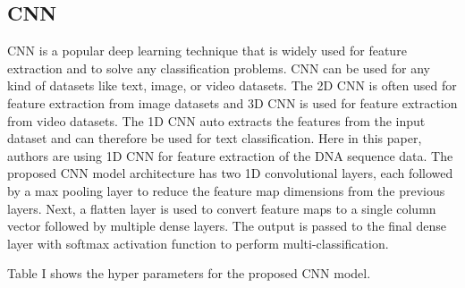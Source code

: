 \documentclass[journal]{IEEEtran}
\begin{document}
  \subsection{CNN}
    CNN is a popular deep learning technique that is widely used for feature extraction 
    and to solve any classification problems. 
    CNN can be used for any kind of datasets like text, image, or video datasets. 
    The 2D CNN is often used for feature extraction from image datasets and 
    3D CNN is used for feature extraction from video datasets. 
    The 1D CNN auto extracts the features from the input dataset and can therefore be used 
    for text classification. Here in this paper, authors are using 1D CNN for feature extraction 
    of the DNA sequence data. The proposed CNN model architecture has two 1D convolutional layers,
    each followed by a max pooling layer to reduce the feature map dimensions from the previous layers.
    Next, a flatten layer is used to convert feature maps to a single column vector followed by multiple dense layers. 
    The output is passed to the final dense layer with softmax activation function to perform multi-classification. 
    
    Table I shows the hyper parameters for the proposed CNN model.
    \begin{table}
      \caption{\label{tab:table-name}Hyper parameters of CNN model}
      \centering
    \end{table}
\end{document}
